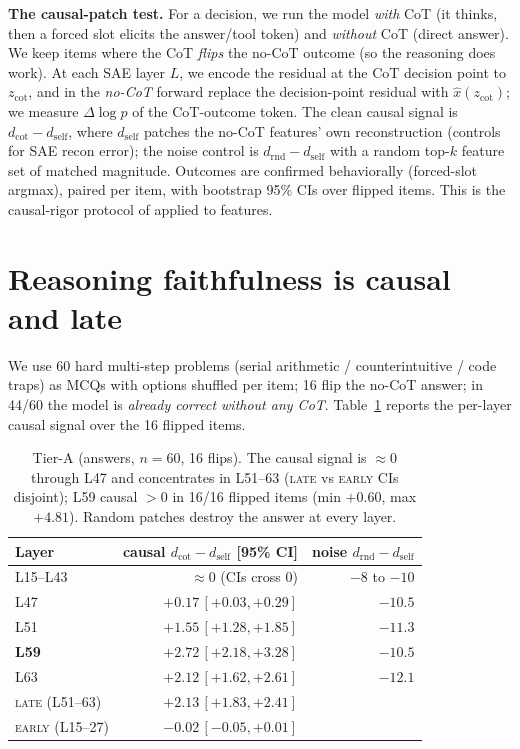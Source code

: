 \documentclass[11pt]{article}
\begin{document}
\textbf{The causal-patch test.} For a decision, we run the model \emph{with} CoT (it thinks, then a forced slot
elicits the answer/tool token) and \emph{without} CoT (direct answer). We keep items where the CoT
\emph{flips} the no-CoT outcome (so the reasoning does work). At each SAE layer $L$, we encode the residual at
the CoT decision point to $z_{\text{cot}}$, and in the \emph{no-CoT} forward replace the decision-point residual
with $\hat x(z_{\text{cot}})$; we measure $\Delta\log p$ of the CoT-outcome token. The clean causal signal is
$d_{\text{cot}}-d_{\text{self}}$, where $d_{\text{self}}$ patches the no-CoT features' own reconstruction
(controls for SAE recon error); the noise control is $d_{\text{rnd}}-d_{\text{self}}$ with a random
top-$k$ feature set of matched magnitude. Outcomes are confirmed behaviorally (forced-slot argmax), paired per
item, with bootstrap 95\% CIs over flipped items. This is the causal-rigor protocol of \cite{leverlate} applied
to features.

\section{Reasoning faithfulness is causal and late}\label{sec:tierA}
We use 60 hard multi-step problems (serial arithmetic / counterintuitive / code traps) as MCQs with options
shuffled per item; 16 flip the no-CoT answer; in 44/60 the model is \emph{already correct without any CoT}.
Table~\ref{tab:tierA} reports the per-layer causal signal over the 16 flipped items.

\begin{table}[h]\centering\small
\begin{tabular}{lrr}
\toprule
Layer & causal $d_{\text{cot}}-d_{\text{self}}$ [95\% CI] & noise $d_{\text{rnd}}-d_{\text{self}}$\\
\midrule
L15--L43 & $\approx 0$ (CIs cross 0) & $-8$ to $-10$\\
L47 & $+0.17\,[+0.03,+0.29]$ & $-10.5$\\
L51 & $+1.55\,[+1.28,+1.85]$ & $-11.3$\\
\textbf{L59} & $\mathbf{+2.72\,[+2.18,+3.28]}$ & $-10.5$\\
L63 & $+2.12\,[+1.62,+2.61]$ & $-12.1$\\
\midrule
\textsc{late} (L51--63) & $+2.13\,[+1.83,+2.41]$ & \\
\textsc{early} (L15--27) & $-0.02\,[-0.05,+0.01]$ & \\
\bottomrule
\end{tabular}
\caption{Tier-A (answers, $n{=}60$, 16 flips). The causal signal is $\approx 0$ through L47 and concentrates in
L51--63 (\textsc{late} vs \textsc{early} CIs disjoint); L59 causal $>0$ in 16/16 flipped items (min $+0.60$, max
$+4.81$). Random patches destroy the answer at every layer.}\label{tab:tierA}
\end{table}
\end{document}
